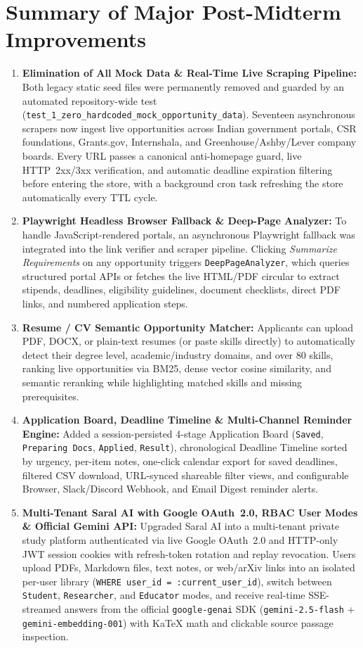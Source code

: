 \documentclass[12pt,a4paper,oneside]{report}
\begin{document}
\section{Summary of Major Post-Midterm Improvements}
\begin{enumerate}[itemsep=4pt]
    \item \textbf{Elimination of All Mock Data \& Real-Time Live Scraping Pipeline:} Both legacy static seed files were permanently removed and guarded by an automated repository-wide test (\texttt{test\_1\_zero\_hardcoded\_mock\_opportunity\_data}). Seventeen asynchronous scrapers now ingest live opportunities across Indian government portals, CSR foundations, Grants.gov, Internshala, and Greenhouse/Ashby/Lever company boards. Every URL passes a canonical anti-homepage guard, live HTTP~2xx/3xx verification, and automatic deadline expiration filtering before entering the store, with a background cron task refreshing the store automatically every TTL cycle.
    \item \textbf{Playwright Headless Browser Fallback \& Deep-Page Analyzer:} To handle JavaScript-rendered portals, an asynchronous Playwright fallback was integrated into the link verifier and scraper pipeline. Clicking \textit{Summarize Requirements} on any opportunity triggers \texttt{DeepPageAnalyzer}, which queries structured portal APIs or fetches the live HTML/PDF circular to extract stipends, deadlines, eligibility guidelines, document checklists, direct PDF links, and numbered application steps.
    \item \textbf{Resume / CV Semantic Opportunity Matcher:} Applicants can upload PDF, DOCX, or plain-text resumes (or paste skills directly) to automatically detect their degree level, academic/industry domains, and over 80 skills, ranking live opportunities via BM25, dense vector cosine similarity, and semantic reranking while highlighting matched skills and missing prerequisites.
    \item \textbf{Application Board, Deadline Timeline \& Multi-Channel Reminder Engine:} Added a session-persisted 4-stage Application Board (\texttt{Saved}, \texttt{Preparing Docs}, \texttt{Applied}, \texttt{Result}), chronological Deadline Timeline sorted by urgency, per-item notes, one-click calendar export for saved deadlines, filtered CSV download, URL-synced shareable filter views, and configurable Browser, Slack/Discord Webhook, and Email Digest reminder alerts.
    \item \textbf{Multi-Tenant Saral AI with Google OAuth~2.0, RBAC User Modes \& Official Gemini API:} Upgraded Saral AI into a multi-tenant private study platform authenticated via live Google OAuth~2.0 and HTTP-only JWT session cookies with refresh-token rotation and replay revocation. Users upload PDFs, Markdown files, text notes, or web/arXiv links into an isolated per-user library (\texttt{WHERE user\_id = :current\_user\_id}), switch between \texttt{Student}, \texttt{Researcher}, and \texttt{Educator} modes, and receive real-time SSE-streamed answers from the official \texttt{google-genai} SDK (\texttt{gemini-2.5-flash} + \texttt{gemini-embedding-001}) with KaTeX math and clickable source passage inspection.

\end{enumerate}
\end{document}
